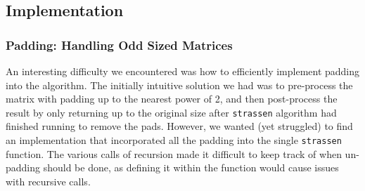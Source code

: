 \documentclass[11pt]{scrartcl}
\theoremstyle{dotlessP}
\theoremstyle{dotlessN}
\theoremstyle{dotN}
\begin{document}
\subsection{Implementation}
\subsubsection{Padding: Handling Odd Sized Matrices}
An interesting difficulty we encountered was how to efficiently implement padding into the algorithm. The initially intuitive solution we had was to pre-process the matrix with padding up to the nearest power of 2, and then post-process the result by only returning up to the original size after \texttt{strassen} algorithm had finished running to remove the pads. However, we wanted (yet struggled) to find an implementation that incorporated all the padding into the single \texttt{strassen} function. The various calls of recursion made it difficult to keep track of when un-padding should be done, as defining it within the function would cause issues with recursive calls. \\
\end{document}
